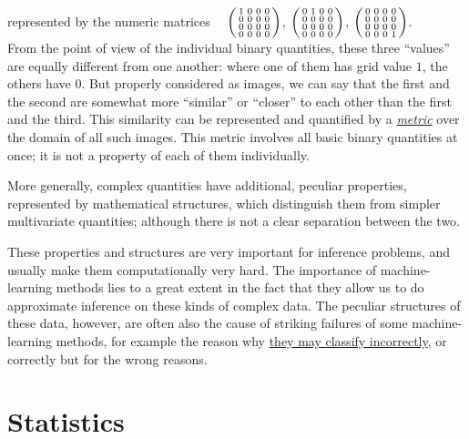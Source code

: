 \documentclass[
  a4paper,
  DIV=11,
  numbers=noendperiod,
  oneside]{scrreprt}
\begin{document}
represented by the numeric matrices
~~{\(\begin{psmallmatrix}1&0&0&0\\0&0&0&0\\0&0&0&0\\0&0&0&0\end{psmallmatrix}\),}
{\(\begin{psmallmatrix}0&1&0&0\\0&0&0&0\\0&0&0&0\\0&0&0&0\end{psmallmatrix}\),}
{\(\begin{psmallmatrix}0&0&0&0\\0&0&0&0\\0&0&0&0\\0&0&0&1\end{psmallmatrix}\).}\\
From the point of view of the individual binary quantities, these three
``values'' are equally different from one another: where one of them has
grid value \(1\), the others have \(0\). But properly considered as
images, we can say that the first and the second are somewhat more
``similar'' or ``closer'' to each other than the first and the third.
This similarity can be represented and quantified by a
\href{https://mathworld.wolfram.com/Metric.html}{\emph{metric}} over the
domain of all such images. This metric involves all basic binary
quantities at once; it is not a property of each of them individually.

More generally, complex quantities have additional, peculiar properties,
represented by mathematical structures, which distinguish them from
simpler multivariate quantities; although there is not a clear
separation between the two.

These properties and structures are very important for inference
problems, and usually make them computationally very hard. The
importance of machine-learning methods lies to a great extent in the
fact that they allow us to do approximate inference on these kinds of
complex data. The peculiar structures of these data, however, are often
also the cause of striking failures of some machine-learning methods,
for example the reason why
\href{https://towardsdatascience.com/breaking-neural-networks-with-adversarial-attacks-f4290a9a45aa}{they
may classify incorrectly}, or correctly but for the wrong reasons.

\hypertarget{statistics}{%
\chapter{Statistics}\label{statistics}}
\end{document}
